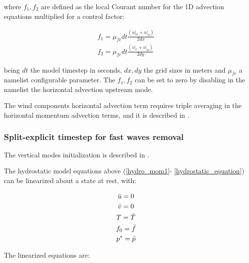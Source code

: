 where $f_1,f_2$ are defined as the local Courant number for the 1D advection
equations multiplied for a control factor:

\begin{eqnarray}
\label{advection_equation_3}
f_1 = \mu_{fc} dt \frac{(u|_a + u|_b)}{2dx} \\
f_2 = \mu_{fc} dt \frac{(v|_c + v|_d)}{2dy}
\end{eqnarray}

being $dt$ the model timestep in seconds, $dx,dy$ the grid sizes in meters and
$\mu_{fc}$ a namelist configurable parameter. The $f_1,f_2$ can be set
to zero by disabling in the namelist the horizontal advection upstream mode.

The wind components horizontal advection term requires triple averaging in
the horizontal momentum advection terms, and it is described in
\cite{Anthes_72}.

\subsubsection{Split-explicit timestep for fast waves removal}

The vertical modes initialization is  described in \cite{Madala_81,Errico_88}.

The hydrostatic model equations above (\ref{hydro_mom1}-
\ref{hydrostatic_equation}) can be linearized about a state at rest,
with:

\begin{gather}
\label{reference_atm}
  \bar{u} = 0 \nonumber \\
  \bar{v} = 0 \nonumber \\
  T = \bar{T} \nonumber \\
  f_0 = \bar{f} \nonumber \\
  p^{\ast} = \bar{p}
\end{gather}

The linearized equations are:

